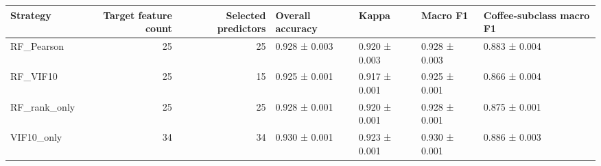 \begin{tabular}{lrrllll}
\toprule
Strategy & Target feature count & Selected predictors & Overall accuracy & Kappa & Macro F1 & Coffee-subclass macro F1 \\
\midrule
RF_Pearson & 25 & 25 & 0.928 ± 0.003 & 0.920 ± 0.003 & 0.928 ± 0.003 & 0.883 ± 0.004 \\
RF_VIF10 & 25 & 15 & 0.925 ± 0.001 & 0.917 ± 0.001 & 0.925 ± 0.001 & 0.866 ± 0.004 \\
RF_rank_only & 25 & 25 & 0.928 ± 0.001 & 0.920 ± 0.001 & 0.928 ± 0.001 & 0.875 ± 0.001 \\
VIF10_only & 34 & 34 & 0.930 ± 0.001 & 0.923 ± 0.001 & 0.930 ± 0.001 & 0.886 ± 0.003 \\
\bottomrule
\end{tabular}
